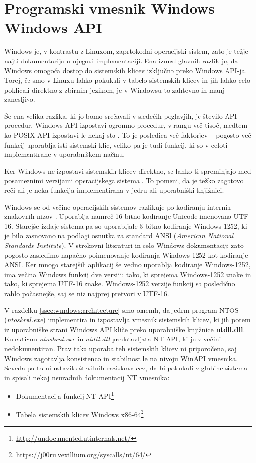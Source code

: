 \documentclass[a4paper,12pt,openright]{book}
\begin{document}
\section{Programski vmesnik Windows -- Windows API} \label{sec:windows_api}

Windows je, v kontrastu z Linuxom, zaprtokodni operacijski sistem, zato je težje najti dokumentacijo o njegovi implementaciji.
Ena izmed glavnih razlik je, da Windows omogoča dostop do sistemskih klicev izključno preko Windows API-ja.
Torej, če smo v Linuxu lahko pokukali v tabelo sistemskih klicev in jih lahko celo poklicali direktno z zbirnim jezikom, je v Windowsu to zahtevno in manj zanesljivo.

Še ena velika razlika, ki jo bomo srečavali v sledečih poglavjih, je število API procedur.
Windows API izpostavi ogromno procedur, v rangu več tisoč, medtem ko POSIX API izpostavi le nekaj sto \cite{Tanenbaum_Bos_2023}.
To je posledica več faktorjev -- pogosto več funkcij uporablja isti sistemski klic, veliko pa je tudi funkcij, ki so v celoti implementirane v uporabniškem načinu.

Ker Windows ne izpostavi sistemskih klicev direktno, se lahko ti spreminjajo med posameznimi verzijami operacijskega sistema \cite{Tanenbaum_Bos_2023}.
To pomeni, da je težko zagotovo reči ali je neka funkcija implementirana v jedru ali uporabniški knjižnici.

Windows se od večine operacijskih sistemov razlikuje po kodiranju internih znakovnih nizov \cite{Yosifovich_Russinovich_Solomon_Ionescu_2017}.
Uporablja namreč 16-bitno kodiranje Unicode imenovano UTF-16.
Starejše izdaje sistema pa so uporabljale 8-bitno kodiranje Windows-1252, ki je bilo zasnovano na podlagi osnutka za standard ANSI (\textit{American National Standards Institute}).
V strokovni literaturi in celo Windows dokumentaciji zato pogosto zasledimo napačno poimenovanje kodiranja Windows-1252 kot kodiranje ANSI.
Ker mnogo starejših aplikacij še vedno uporablja kodiranje Windows-1252, ima večina Windows funkcij dve verziji: tako, ki sprejema Windows-1252 znake in tako, ki sprejema UTF-16 znake.
Windows-1252 verzije funkcij so posledično rahlo počasnejše, saj se niz najprej pretvori v UTF-16.

V razdelku \ref{ssec:windows:architecture} smo omenili, da jedrni program NTOS (\textit{ntoskrnl.exe}) implementira in izpostavlja vmesnik sistemskih klicev, ki jih potem iz uporabniške strani Windows API kliče preko uporabniške knjižnice \textbf{ntdll.dll}.
Kolektivno \textit{ntoskrnl.exe} in \textit{ntdll.dll} predstavljata NT API, ki je v večini nedokumentiran.
Prav tako uporaba teh sistemskih klicev ni priporočena, saj Windows zagotavlja konsistenco in stabilnost le na nivoju WinAPI vmesnika.
Seveda pa to ni ustavilo številnih raziskovalcev, da bi pokukali v globine sistema in spisali nekaj neuradnih dokumentacij NT vmesnika:
\begin{itemize}
	\item Dokumentacija funkcij NT API\footnote{\url{http://undocumented.ntinternals.net/}}
	\item Tabela sistemskih klicev Windows x86-64\footnote{\url{https://j00ru.vexillium.org/syscalls/nt/64/}}
\end{itemize}
\end{document}
